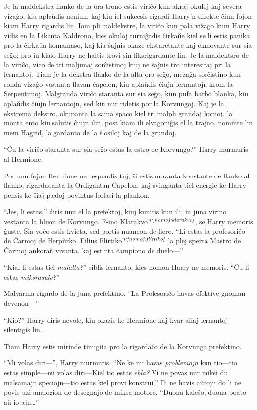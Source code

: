 Je la maldekstra flanko de la ora trono estis viriĉo kun akraj okuloj
kaj severa vizaĝo, kiu aplaŭdis neniun, kaj kiu iel sukcesis rigardi
Harry'n direkte ĉiun fojon kiam Harry rigardis lin. Iom pli
maldekstre, la viriĉo kun pala viẑago kiun Harry vidis en la Likanta
Kaldrono, kies okuloj turniĝadis ĉirkaŭe kiel se li estis panika pro
la ĉirkaŭa homamaso, kaj kiu ŝajnis okaze ekstaretante kaj ekmovante
sur sia seĝo; pro iu kialo Harry ne haltis trovi sin fiksrigardante
lin.  Je la maldektsro de la viriĉo, vico de tri maljunaj sorĉistinoj
kiuj ne ŝaĵnis tro interesitaj pri la lernantoj. Tiam je la dekstra
flanko de la alta ora seĝo, mezaĝa sorĉistino kun ronda vizaĝo
vestanta flavan ĉapelon, kiu aplaŭdis ĉiujn lernantojn krom la
Serpentimoj. Malgranda viriĉo staranta sur sia seĝo, kun pufa barbo
blanka, kiu aplaŭdis ĉiujn lernantojn, sed kiu nur ridetis por la
Korvungoj. Kaj je la ekstrema dekstro, okupanta la sama spaco kiel tri
malpli grandaj homoj, la monta ento kiu salutis ĉiujn ilin, post kiam
ili elvagoniĝis el la trajno, nominte lin mem Hagrid, la gardanto de
la ŝlosiloj kaj de la grundoj.

``Ĉu la viriĉo staranta sur sia seĝo estas la estro de Korvungo?''
Harry murmuris al Hermione.

Por unu fojon Hermione ne respondis tuj; ŝi estis movanta konstante de
flanko al flanko, rigardadanta la Ordigantan Ĉapelon, kaj svinganta
tiel energie ke Harry pensis ke ŝiaj piedoj povintus forlasi la
plankon.

``Jes, li estas,'' diris unu el la prefektoj, kiuj kuniris kun ili, iu
juna virino vestanta la bluon de Korvungo. F-ino
Klarakvo$^{\textit{n:\ref{nomoj:klarakvo}}}$, se Harry memoris ĝuste. Ŝia voĉo
estis kvieta, sed portis nuancon de fiero. ``Li estas la profesoriĉo
de Ĉarmoj de Herpŭrko, Filius Flirtiko$^{\textit{n:\ref{nomoj:flirtiko}}}$ la plej
sperta Mastro de Ĉarmoj ankoraŭ vivanta, kaj estinta ĉampiono de
duelo—''

``Kial li estas tiel \emph{malalta?}'' siblis lernanto, kies nomon
Harry ne memoris. ``Ĉu li estas \emph{miksrasulo?}''

Malvarma rigardo de la juna prefektino. ``La Profesoriĉo havas
efektive gnoman devenon—''

``Kio?'' Harry diris nevole, kiu okazis ke Hermione kaj kvar aliaj
lernantoj silentigis lin.

Tiam Harry estis mirinde timigita pro la rigardaĉo de la Korvunga
prefektino.

``Mi volas diri—'', Harry murmuris. ``Ne ke mi havas \emph{problemojn}
kun tio—tio estas simple—mi volas diri—Kiel tio estas \emph{ebla?} Vi
ne povas nur miksi du malsamajn speciojn—tio estas kiel provi
konstrui,'' Ili ne havis aŭtojn do li ne povis uzi analogion de
desegnaĵo de miksa motoro, ``Duona-kaleŝo, duona-boato aŭ io
ajn\ldots''

